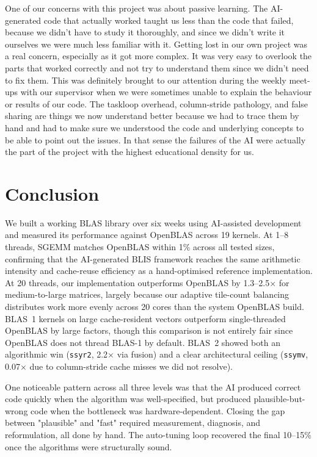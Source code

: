 \documentclass[11pt,a4paper]{article}
\begin{document}
One of our concerns with this project was about passive learning.
The AI-generated code that actually worked taught us less than the code that failed, because we didn't have to study it thoroughly, and since we didn't write it ourselves we were much less familiar with it. Getting lost in our own project was a real concern, especially as it got more complex. It was very easy to overlook the parts that worked correctly and not try to understand them since we didn't need to fix them. This was definitely brought to our attention during the weekly meet-ups with our supervisor when we were sometimes unable to explain the behaviour or results of our code.
The taskloop overhead, column-stride pathology, and false sharing are things
we now understand better because we had to trace them by hand and had to make sure we understood the code and underlying concepts to be able to point out the issues.
In that sense the failures of the AI were actually the part
of the project with the highest educational density for us.

\section{Conclusion}

We built a working BLAS library over six weeks using AI-assisted development
and measured its performance against OpenBLAS across 19 kernels.
At 1--8 threads, SGEMM matches OpenBLAS within 1\% across all tested sizes,
confirming that the AI-generated BLIS framework reaches the same arithmetic intensity
and cache-reuse efficiency as a hand-optimised reference implementation.
At 20 threads, our implementation outperforms OpenBLAS by 1.3--2.5$\times$ for
medium-to-large matrices, largely because our adaptive tile-count balancing
distributes work more evenly across 20 cores than the system OpenBLAS build.
BLAS~1 kernels on large cache-resident vectors outperform single-threaded OpenBLAS
by large factors, though this comparison is not entirely fair since OpenBLAS
does not thread BLAS-1 by default.
BLAS~2 showed both an algorithmic win (\texttt{ssyr2}, 2.2$\times$ via fusion)
and a clear architectural ceiling (\texttt{ssymv}, 0.07$\times$ due to
column-stride cache misses we did not resolve).

One noticeable pattern across all three levels was that
the AI produced correct code quickly when the algorithm was well-specified,
but produced plausible-but-wrong code when the bottleneck was hardware-dependent.
Closing the gap between "plausible" and "fast" required measurement, diagnosis,
and reformulation, all done by hand.
The auto-tuning loop recovered the final 10--15\% once the algorithms were structurally sound.
\end{document}
